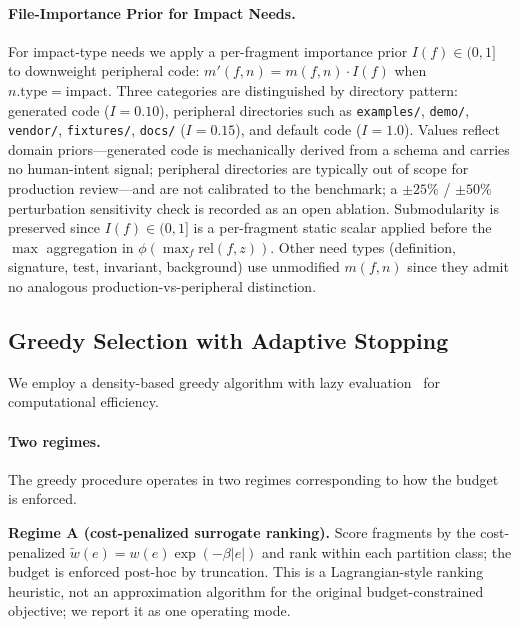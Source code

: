 \documentclass[11pt, a4paper]{article}
\begin{document}
\paragraph{File-Importance Prior for Impact Needs.}
\label{sec:importance}
For impact-type needs we apply a per-fragment importance prior $I(f) \in (0, 1]$ to downweight peripheral code: $m'(f, n) = m(f, n) \cdot I(f)$ when $n.\mathrm{type} = \mathrm{impact}$. Three categories are distinguished by directory pattern: generated code ($I = 0.10$), peripheral directories such as \texttt{examples/}, \texttt{demo/}, \texttt{vendor/}, \texttt{fixtures/}, \texttt{docs/} ($I = 0.15$), and default code ($I = 1.0$). Values reflect domain priors---generated code is mechanically derived from a schema and carries no human-intent signal; peripheral directories are typically out of scope for production review---and are not calibrated to the benchmark; a $\pm 25\%$ / $\pm 50\%$ perturbation sensitivity check is recorded as an open ablation. Submodularity is preserved since $I(f) \in (0, 1]$ is a per-fragment static scalar applied before the $\max$ aggregation in $\phi(\max_f \mathrm{rel}(f, z))$. Other need types (definition, signature, test, invariant, background) use unmodified $m(f, n)$ since they admit no analogous production-vs-peripheral distinction.

\subsection{Greedy Selection with Adaptive Stopping}
\label{sec:greedy}

We employ a density-based greedy algorithm with lazy evaluation~\cite{minoux1978accelerated} for computational efficiency.

\paragraph{Two regimes.} The greedy procedure operates in two regimes corresponding to how the budget is enforced.

\textbf{Regime A (cost-penalized surrogate ranking).} Score fragments by the cost-penalized $\tilde{w}(e) = w(e) \exp(-\beta |e|)$ and rank within each partition class; the budget is enforced post-hoc by truncation. This is a Lagrangian-style ranking heuristic, not an approximation algorithm for the original budget-constrained objective; we report it as one operating mode.
\end{document}
